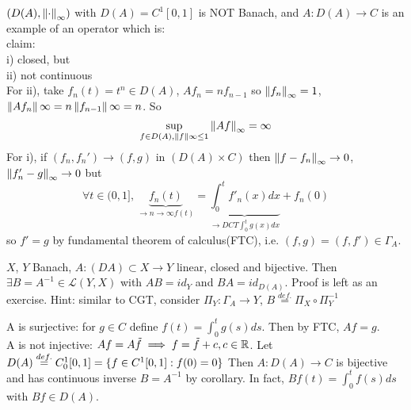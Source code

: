 \documentclass{article}
\begin{document}
\begin{example}
	$(D(A),\left\|{\cdot}\right\|_\infty)$ with $D(A)=C^1[0,1]$ is NOT Banach, and $A:D(A)\to C$ is an example of an operator which is:\\
	claim: \\
	i) closed, but\\
	ii) not continuous\\
	For ii), take $f_n(t)=t^n\in D(A)$, $Af_n=nf_{n-1}$ so $\left\|{f_n}\right\|_\infty=1$, $\left\|{Af_n}\right\|\infty=n\left\|{f_{n-1}}\right\|\infty=n$. So 
	$$ \sup_{f\in D(A),\left\|{f}\right\|\infty\leq1}\left\|{Af}\right\|_\infty=\infty$$
	For i), if $(f_n,f_n')\to(f,g)$ in $(D(A)\times C)$ then $\left\|{f-f_n}\right\|_\infty\to 0$, $\left\|{f_n'-g}\right\|_\infty\to0$ but
	$$
	\forall t\in(0,1],\,\underbrace{f_n(t)}_{\rightarrow{n\to\infty}f(t)}
	=\underbrace{\int_0^t f'_n(x) dx}_{\rightarrow{DCT}\int_0^t g(x) dx}
	+f_n(0)
	$$
	so $f'=g$ by fundamental theorem of calculus(FTC), i.e. $(f,g)=(f,f')\in\Gamma_A$.
\end{example}


\begin{corollary}\nl
	$X$, $Y$ Banach, $A:(DA)\subset X\to Y$ linear, closed and bijective. Then $\exists B=A^{-1}\in\mathcal{L}(Y,X)$ with $AB=id_Y$ and $BA=id_{D(A)}$.
	Proof is left as an exercise. Hint: similar to CGT, consider $\Pi_Y:\Gamma_A\to Y$, $B\stackrel{def.}{=}\Pi_X\circ \Pi_Y^{-1}$
	
\end{corollary}

\begin{example}[???]\nl
	A is surjective: for $g\in C$ define $f(t)=\int_0^t g(s) ds$. Then by FTC, $Af=g$.\\
	A is not injective: $Af=A\tilde{f}\implies f=\tilde{f}+c,c\in\mathbb{R}$. 
	Let $D(A)\stackrel{def.}{=} C_0^1[0,1]=\{f\in C^1[0,1]:f(0)=0\}$
	Then $A:D(A)\to C$ is bijective and has continuous inverse $B=A^{-1}$ by corollary. In fact, $Bf(t)=\int_0^tf(s)ds$ with $Bf\in D(A)$.
\end{example}
\end{document}
